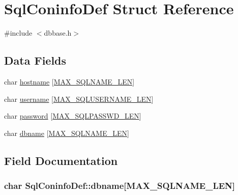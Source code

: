 \hypertarget{structSqlConinfoDef}{\section{Sql\-Coninfo\-Def Struct Reference}
\label{structSqlConinfoDef}
}


{\ttfamily \#include $<$dbbase.\-h$>$}

\subsection*{Data Fields}
\begin{DoxyCompactItemize}
\item 
char \hyperlink{structSqlConinfoDef_a92dd97dc90ef98dc5e94873c3e7ecba0}{hostname} \mbox{[}\hyperlink{dbbase_8h_a06a9cf374e83dcac0620e5095f79234e}{M\-A\-X\-\_\-\-S\-Q\-L\-N\-A\-M\-E\-\_\-\-L\-E\-N}\mbox{]}
\item 
char \hyperlink{structSqlConinfoDef_ad5932393c1ac16a9d33378ef2f573440}{username} \mbox{[}\hyperlink{dbbase_8h_a998c6ce37817a02bf23a1a2c6fd15cb0}{M\-A\-X\-\_\-\-S\-Q\-L\-U\-S\-E\-R\-N\-A\-M\-E\-\_\-\-L\-E\-N}\mbox{]}
\item 
char \hyperlink{structSqlConinfoDef_af063d8739c1418a68dd2c7b949440600}{password} \mbox{[}\hyperlink{dbbase_8h_ae5cf418bda87e648ae461cfbca7e2f8e}{M\-A\-X\-\_\-\-S\-Q\-L\-P\-A\-S\-S\-W\-D\-\_\-\-L\-E\-N}\mbox{]}
\item 
char \hyperlink{structSqlConinfoDef_a26423e4de804409a716f3c28202ae1f3}{dbname} \mbox{[}\hyperlink{dbbase_8h_a06a9cf374e83dcac0620e5095f79234e}{M\-A\-X\-\_\-\-S\-Q\-L\-N\-A\-M\-E\-\_\-\-L\-E\-N}\mbox{]}
\end{DoxyCompactItemize}


\subsection{Field Documentation}
\hypertarget{structSqlConinfoDef_a26423e4de804409a716f3c28202ae1f3}{
\subsubsection[{dbname}]{\setlength{\rightskip}{0pt plus 5cm}char Sql\-Coninfo\-Def\-::dbname\mbox{[}{\bf M\-A\-X\-\_\-\-S\-Q\-L\-N\-A\-M\-E\-\_\-\-L\-E\-N}\mbox{]}}}\label{structSqlConinfoDef_a26423e4de804409a716f3c28202ae1f3}


